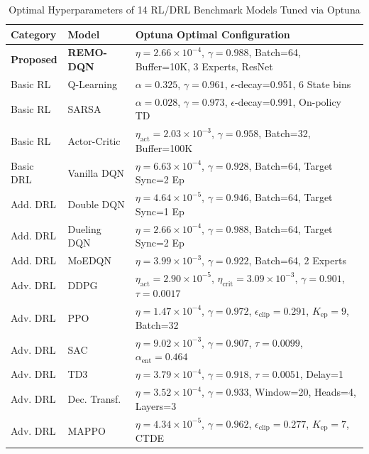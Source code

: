 \documentclass[journal]{IEEEtran}
\begin{document}
\begin{table}[t]
\caption{Optimal Hyperparameters of 14 RL/DRL Benchmark Models Tuned via Optuna}
\label{tab:optuna_params}
\centering
\scriptsize
\begin{tabularx}{\linewidth}{l l L}
\toprule
\textbf{Category} & \textbf{Model} & \textbf{Optuna Optimal Configuration} \\
\midrule
\textbf{Proposed} & \textbf{REMO-DQN} & $\eta=2.66\times 10^{-4}$, $\gamma=0.988$, Batch=64, Buffer=10K, 3 Experts, ResNet \\
Basic RL & Q-Learning & $\alpha=0.325$, $\gamma=0.961$, $\epsilon$-decay=0.951, 6 State bins \\
Basic RL & SARSA & $\alpha=0.028$, $\gamma=0.973$, $\epsilon$-decay=0.991, On-policy TD \\
Basic RL & Actor-Critic & $\eta_{\text{act}}=2.03\times 10^{-3}$, $\gamma=0.958$, Batch=32, Buffer=100K \\
Basic DRL & Vanilla DQN & $\eta=6.63\times 10^{-4}$, $\gamma=0.928$, Batch=64, Target Sync=2 Ep \\
Add. DRL & Double DQN & $\eta=4.64\times 10^{-5}$, $\gamma=0.946$, Batch=64, Target Sync=1 Ep \\
Add. DRL & Dueling DQN & $\eta=2.66\times 10^{-4}$, $\gamma=0.988$, Batch=64, Target Sync=2 Ep \\
Add. DRL & MoEDQN & $\eta=3.99\times 10^{-3}$, $\gamma=0.922$, Batch=64, 2 Experts \\
Adv. DRL & DDPG & $\eta_{\text{act}}=2.90\times 10^{-5}$, $\eta_{\text{crit}}=3.09\times 10^{-3}$, $\gamma=0.901$, $\tau=0.0017$ \\
Adv. DRL & PPO & $\eta=1.47\times 10^{-4}$, $\gamma=0.972$, $\epsilon_{\text{clip}}=0.291$, $K_{\text{ep}}=9$, Batch=32 \\
Adv. DRL & SAC & $\eta=9.02\times 10^{-3}$, $\gamma=0.907$, $\tau=0.0099$, $\alpha_{\text{ent}}=0.464$ \\
Adv. DRL & TD3 & $\eta=3.79\times 10^{-4}$, $\gamma=0.918$, $\tau=0.0051$, Delay=1 \\
Adv. DRL & Dec. Transf. & $\eta=3.52\times 10^{-4}$, $\gamma=0.933$, Window=20, Heads=4, Layers=3 \\
Adv. DRL & MAPPO & $\eta=4.34\times 10^{-5}$, $\gamma=0.962$, $\epsilon_{\text{clip}}=0.277$, $K_{\text{ep}}=7$, CTDE \\
\bottomrule
\end{tabularx}
\end{table}
\end{document}
